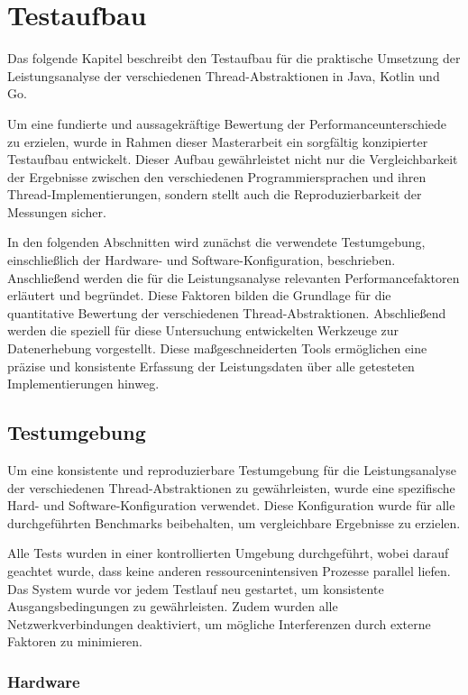 \documentclass[fontsize=12pt,paper=a4,twoside=semi,parskip=half-,headsepline,headinclude]{scrreprt}
\begin{document}
\chapter{Testaufbau}

Das folgende Kapitel beschreibt den Testaufbau für die praktische Umsetzung der Leistungsanalyse der verschiedenen Thread-Abstraktionen in Java, Kotlin und Go. 

Um eine fundierte und aussagekräftige Bewertung der Per\-for\-mance\-un\-ter\-schiede zu erzielen, wurde in Rahmen dieser Masterarbeit ein sorgfältig konzipierter Testaufbau entwickelt. Dieser Aufbau gewährleistet nicht nur die Vergleichbarkeit der Ergebnisse zwischen den verschiedenen Programmiersprachen und ihren Thread-Implementierungen, sondern stellt auch die Reproduzierbarkeit der Messungen sicher.

In den folgenden Abschnitten wird zunächst die verwendete Testumgebung, einschließlich der Hardware- und Software-Konfiguration, beschrieben. Anschließend werden die für die Leistungsanalyse relevanten Performancefaktoren erläutert und begründet. Diese Faktoren bilden die Grundlage für die quantitative Bewertung der verschiedenen Thread-Abs\-trak\-tio\-nen. Abschließend werden die speziell für diese Untersuchung entwickelten Werkzeuge zur Datenerhebung vorgestellt. Diese maßgeschneiderten Tools ermöglichen eine präzise und konsistente Erfassung der Leistungsdaten über alle getesteten Implementierungen hinweg.

\section{Testumgebung}

Um eine konsistente und reproduzierbare Testumgebung für die Leistungsanalyse der verschiedenen Thread-Abs\-trak\-tio\-nen zu gewährleisten, wurde eine spezifische Hard- und Soft\-ware-Konfiguration verwendet. Diese Konfiguration wurde für alle durchgeführten Benchmarks beibehalten, um vergleichbare Ergebnisse zu erzielen.

Alle Tests wurden in einer kontrollierten Umgebung durchgeführt, wobei darauf geachtet wurde, dass keine anderen ressourcenintensiven Prozesse parallel liefen. Das System wurde vor jedem Testlauf neu gestartet, um konsistente Ausgangsbedingungen zu gewährleisten. Zudem wurden alle Netzwerkverbindungen deaktiviert, um mögliche Interferenzen durch externe Faktoren zu minimieren.

\newpage
\subsection{Hardware}
\end{document}
